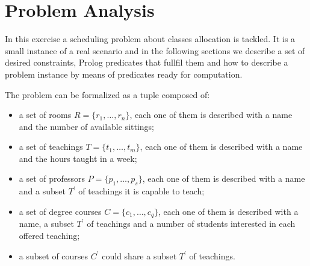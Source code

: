 \documentclass[10pt,a4paper]{article} %
\begin{document}
    \title{\rmfamily\normalfont{}}
    \author{}
    \date{\today}

    \maketitle

    \begin{abstract}
        This short document explains my work to support
        AI exam, taught by Prof. Paolo Frasconi at University of Florence,
        comments some results and shows how to reproduce test cases.
        A Prolog program has been implemented in order to  produce a scheduler
        for the problem at hand, satisfying the requested constraints.
    \end{abstract}


    \section{Problem Analysis}
    In this exercise a scheduling problem about classes allocation
    is tackled. It is a small instance of a real scenario
    and in the following sections we describe a set of desired constraints,
    Prolog predicates that fullfil them and how to describe a problem
    instance by means of predicates ready for computation.

    The problem can be formalized as a tuple composed of:
    \begin{itemize}
        \item a set of rooms $R = \lbrace r_1, \ldots, r_n \rbrace$, each
            one of them is described with a name and the number
            of available sittings;
        \item a set of teachings $T = \lbrace t_1, \ldots, t_m \rbrace$, each
            one of them is described with a name and the hours taught in a week;
        \item a set of professors $P = \lbrace p_1, \ldots, p_s \rbrace$, each
            one of them is described with a name and a subset $T^\prime$ of teachings
            it is capable to teach;
        \item a set of degree courses $C = \lbrace c_1, \ldots, c_q \rbrace$, each
            one of them is described with a name, a subset $T^\prime$ of teachings
            and a number of students interested in each offered teaching;
        \item a subset of courses $C^\prime$ could share a subset $T^\prime$ of teachings.
    \end{itemize}
\end{document}
